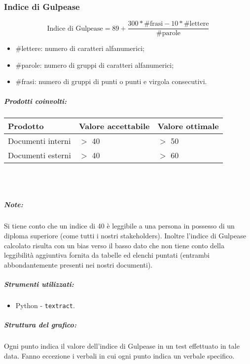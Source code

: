 \documentclass[a4paper, 12pt]{article}
\begin{document}
\subsubsection{Indice di Gulpease}
\[ \text{Indice di Gulpease} = 89 + \frac{300*\text{\#frasi} - 10*\text{\#lettere}}{\text{\#parole}} \]
\begin{itemize}
	\item \#lettere: numero di caratteri alfanumerici;
	\item \#parole: numero di gruppi di caratteri alfanumerici;
	\item \#frasi: numero di gruppi di punti o punti e virgola consecutivi.
\end{itemize}

\subparagraph{Prodotti coinvolti:}
\begin{center}
	\begin{tabularx}{\textwidth}{|X|X|X|}
		\hline
		\textbf{Prodotto} & \textbf{Valore accettabile} & \textbf{Valore ottimale } \\
		\hline
		Documenti interni & $>$ 40                      & $>$ 50                    \\
		\hline
		Documenti esterni & $>$ 40                      & $>$ 60                    \\
		\hline
	\end{tabularx}\\[8pt]
	\mbox{}\\
\end{center}
\subparagraph{Note:}
Si tiene conto che un indice di 40 è leggibile a una persona in possesso di un diploma superiore (come tutti i nostri stakeholders).
Inoltre l'indice di Gulpease calcolato risulta con un bias verso il basso dato che non tiene conto della leggibilità aggiuntiva fornita da tabelle ed elenchi puntati
(entrambi abbondantemente presenti nei nostri documenti).

\subparagraph{Strumenti utilizzati:}
\begin{itemize}
	\item Python - \texttt{textract}.
\end{itemize}

\clearpage

\subparagraph{Struttura del grafico:}
Ogni punto indica il valore dell'indice di Gulpease in un test effettuato in tale data.
Fanno eccezione i verbali in cui ogni punto indica un verbale specifico.
\end{document}
